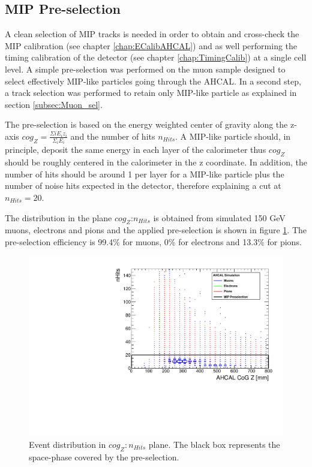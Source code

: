 \subsection{MIP Pre-selection}
\label{subsec:Muon_presel}

A clean selection of MIP tracks is needed in order to obtain and cross-check the MIP calibration (see chapter \ref{chap:ECalibAHCAL}) and as well performing the timing calibration of the detector (see chapter \ref{chap:TimingCalib}) at a single cell level. A simple pre-selection was performed on the muon sample designed to select effectively MIP-like particles going through the AHCAL. In a second step, a track selection was performed to retain only MIP-like particle as explained in section \ref{subsec:Muon_sel}.

The pre-selection is based on the energy weighted center of gravity along the z-axis $cog_Z = \frac{\Sigma{i} E_i z_i}{\Sigma_{i} E_i}$ and the number of hits $n_{Hits}$. A MIP-like particle should, in principle, deposit the same energy in each layer of the calorimeter thus $cog_Z$ should be roughly centered in the calorimeter in the z coordinate. In addition, the number of hits should be around 1 per layer for a MIP-like particle plus the number of noise hits expected in the detector, therefore explaining a cut at $n_{Hits} = 20$.

The distribution in the plane $cog_Z$:$n_{Hits}$ is obtained from simulated 150 GeV muons, electrons and pions and the applied pre-selection is shown in figure \ref{fig:Muons_CoGZ_nHits}. The pre-selection efficiency is 99.4\% for muons, 0\% for electrons and 13.3\% for pions.

\begin{figure}[htbp!]
	\centering
	\includegraphics[width=0.7\linewidth]{../Thesis_Plots/Timing/Muons/Plots/SelectionCut_nHitsCoGZ_Muons}
	\caption{Event distribution in $cog_Z:n_{Hits}$ plane. The black box represents the space-phase covered by the pre-selection.} \label{fig:Muons_CoGZ_nHits}
\end{figure}

